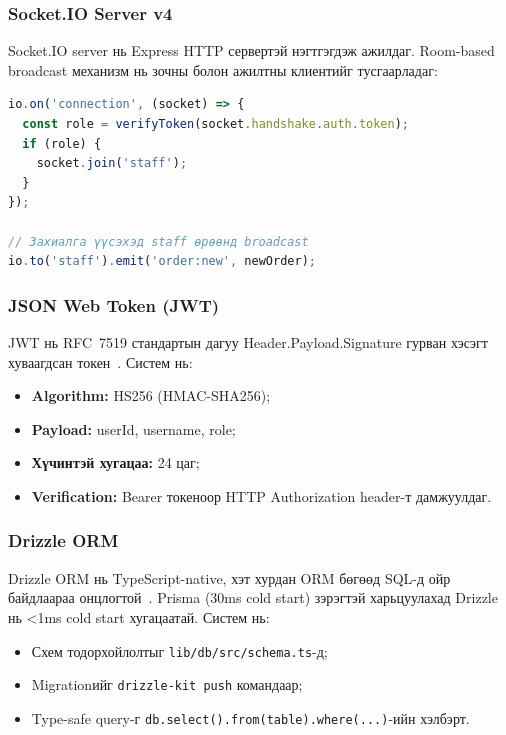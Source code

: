 \documentclass[12pt,a4paper]{article}
\begin{document}
\subsubsection{Socket.IO Server v4}

Socket.IO server нь Express HTTP сервертэй нэгтгэгдэж ажилдаг.
Room-based broadcast механизм нь зочны болон ажилтны клиентийг
тусгаарладаг:

\begin{lstlisting}[language=TypeScript, caption=Socket.IO серверийн жишээ]
io.on('connection', (socket) => {
  const role = verifyToken(socket.handshake.auth.token);
  if (role) {
    socket.join('staff');
  }
});

// Захиалга үүсэхэд staff өрөөнд broadcast
io.to('staff').emit('order:new', newOrder);
\end{lstlisting}

\subsubsection{JSON Web Token (JWT)}

JWT нь RFC~7519 стандартын дагуу Header.Payload.Signature
гурван хэсэгт хуваагдсан токен~\cite{jones2015}. Систем нь:

\begin{itemize}
  \item \textbf{Algorithm:} HS256 (HMAC-SHA256);
  \item \textbf{Payload:} userId, username, role;
  \item \textbf{Хүчинтэй хугацаа:} 24 цаг;
  \item \textbf{Verification:} Bearer токеноор HTTP Authorization
        header-т дамжуулдаг.
\end{itemize}

\subsubsection{Drizzle ORM}

Drizzle ORM нь TypeScript-native, хэт хурдан ORM бөгөөд SQL-д
ойр байдлаараа онцлогтой~\cite{drizzle2023}. Prisma (30ms cold
start) зэрэгтэй харьцуулахад Drizzle нь \textless{}1ms cold start
хугацаатай. Систем нь:

\begin{itemize}
  \item Схем тодорхойлолтыг \texttt{lib/db/src/schema.ts}-д;
  \item Migrationийг \texttt{drizzle-kit push} командаар;
  \item Type-safe query-г \texttt{db.select().from(table).where(...)}-ийн
        хэлбэрт.
\end{itemize}
\end{document}
